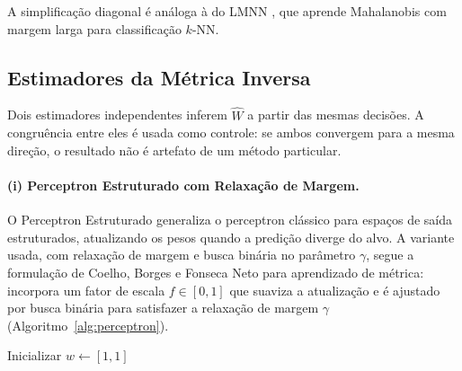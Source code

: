 \documentclass[12pt,a4paper]{article}
\newcommand{\West}{\ensuremath{\hat{W}}}   %
\begin{document}
A simplificação diagonal é análoga à do LMNN \cite{weinbergerDistanceMetric2009}, que
aprende Mahalanobis com margem larga para classificação $k$-NN.

\subsection{Estimadores da Métrica Inversa}

Dois estimadores independentes inferem \West{} a partir das mesmas decisões. A congruência
entre eles é usada como controle: se ambos convergem para a mesma direção, o resultado não
é artefato de um método particular.

\paragraph{(i) Perceptron Estruturado com Relaxação de Margem.}
O Perceptron Estruturado \cite{collinsDiscriminativeTraining2002} generaliza o perceptron
clássico para espaços de saída estruturados, atualizando os pesos quando a predição diverge
do alvo. A variante usada, com relaxação de margem e busca binária no parâmetro $\gamma$,
segue a formulação de Coelho, Borges e Fonseca Neto \cite{coelhoPredicaoEstruturada2017}
para aprendizado de métrica: incorpora um fator de escala $f \in [0,1]$ que suaviza a
atualização e é ajustado por busca binária para satisfazer a relaxação de margem $\gamma$
(Algoritmo~\ref{alg:perceptron}).

\begin{algorithm}[ht]
\DontPrintSemicolon
{}
Inicializar $w \leftarrow [1, 1]$\;
\caption{Perceptron Estruturado com Relaxação de Margem (variante diagonal)}
\label{alg:perceptron}
\end{algorithm}
\end{document}
